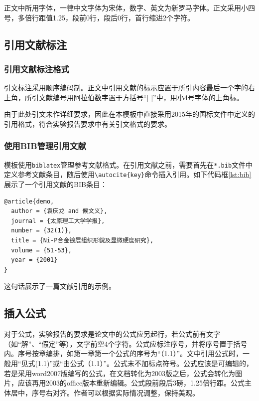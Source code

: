 正文中所用字体，一律中文字体为宋体，数字、英文为新罗马字体。正文采用小四号，多倍行距值1.25，段前0行，段后0行，首行缩进2个字符。

\subsection{引用文献标注}

\subsubsection{引用文献标注格式}

引文标注采用顺序编码制。正文中引用文献的标示应置于所引内容最后一个字的右上角，所引文献编号用阿拉伯数字置于方括号“[ ]”中，用小4号字体的上角标。

由于此处引文未作详细要求，因此在本模板中直接采用2015年的国标文件中定义的引用格式，符合实验报告要求中有关引文格式的要求。

\subsubsection{使用BIB管理引用文献}

模板使用\texttt{biblatex}管理参考文献格式。在引用文献之前，需要首先在\texttt{*.bib}文件中定义参考文献条目，随后使用\texttt{\textbackslash autocite\{key\}}命令插入引用。如下代码框\ref{lst:bib}展示了一个引用文献的BIB条目：

\begin{lstlisting}[caption={BIB引文格式条目示例\label{lst:bib}}]
@article{demo,
  author = {袁庆龙 and 候文义},
  journal = {太原理工大学学报},
  number = {32(1)},
  title = {Ni-P合金镀层组织形貌及显微硬度研究},
  volume = {51-53},
  year = {2001}
}
\end{lstlisting}

这句话展示了一篇文献引用的示例\autocite{demo}。

\subsection{插入公式}

对于公式，实验报告的要求是论文中的公式应另起行，若公式前有文字（如“解”、“假定”等），文字前空4个字符。公式应标注序号，并将序号置于括号内。序号按章编排，如第一章第一个公式的序号为“（1.1）”。文中引用公式时，一般用“见式(1.1)”或“由公式（1.1）”。公式末不加标点符号。公式应该是可编辑的，若是采用word2007版编写的公式，在文档转化为2003版之后，公式会转化为图片，应该再用2003的office版本重新编辑。公式段前段后3磅，1.25倍行距。公式主体居中，序号右对齐。作者可以根据实际情况调整，保持美观。

